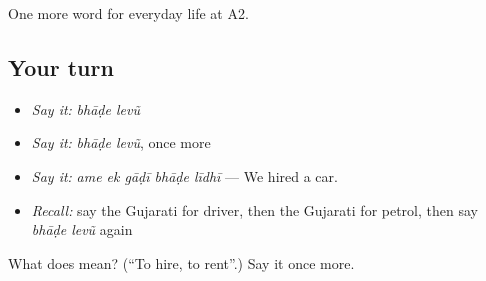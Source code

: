 \begin{grammarlens}[title={What you've built}]
One more word for everyday life at A2.
\end{grammarlens}

\subsection*{Your turn}
\begin{itemize}
\raggedright
  \item \emph{Say it:} \emph{bhāḍe levũ}
  \item \emph{Say it:} \emph{bhāḍe levũ}, once more
  \item \emph{Say it:} \emph{ame ek gāḍī bhāḍe līdhī} — We hired a car.
  \item \emph{Recall:} say the Gujarati for driver, then the Gujarati for petrol, then say \emph{bhāḍe levũ} again
\end{itemize}

\begin{tcolorbox}[breakable,colback=teal!4,colframe=teal!35!black,title={Before you move on}]
What does   mean? (\textquotedblleft{}To hire, to rent\textquotedblright{}.) Say it once more.
\end{tcolorbox}

